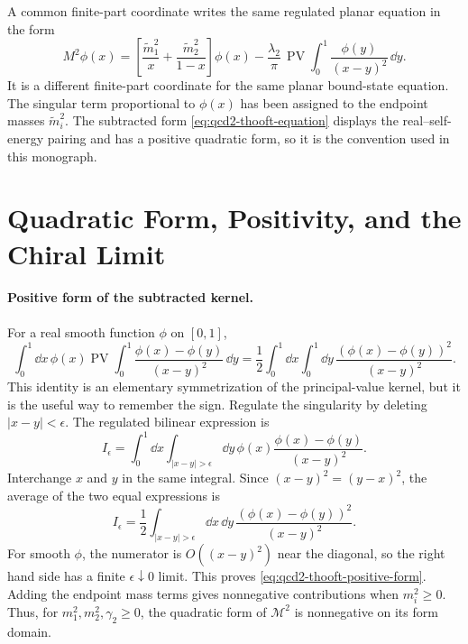 \begin{remark}
A common finite-part coordinate writes the same regulated planar equation
in the form
\[
  M^2\phi(x)
  =
  \left[
    \frac{\widetilde m_1^2}{x}
    +
    \frac{\widetilde m_2^2}{1-x}
  \right]\phi(x)
  -
  \frac{\lambda_2}{\pi}\,
  \operatorname{PV}\int_0^1
  \frac{\phi(y)}{(x-y)^2}\,\dd y .
\]
It is a different finite-part coordinate for the same planar bound-state
equation.  The singular term proportional to \(\phi(x)\) has been assigned
to the endpoint masses \(\widetilde m_i^2\).  The subtracted form
\eqref{eq:qcd2-thooft-equation} displays the real--self-energy pairing and
has a positive quadratic form, so it is the convention used in this
monograph.
\end{remark}

\section{Quadratic Form, Positivity, and the Chiral Limit}

\paragraph{Positive form of the subtracted kernel.}
For a real smooth function \(\phi\) on \([0,1]\),
\begin{equation}
  \int_0^1\dd x\,\phi(x)
  \operatorname{PV}\int_0^1
  \frac{\phi(x)-\phi(y)}{(x-y)^2}\,\dd y
  =
  \frac12
  \int_0^1\dd x\int_0^1\dd y\,
  \frac{(\phi(x)-\phi(y))^2}{(x-y)^2}.
  \label{eq:qcd2-thooft-positive-form}
\end{equation}
This identity is an elementary symmetrization of the principal-value kernel,
but it is the useful way to remember the sign.  Regulate the singularity by
deleting \(|x-y|<\epsilon\).  The regulated bilinear expression is
\[
  I_\epsilon
  =
  \int_0^1\dd x\int_{|x-y|>\epsilon}\dd y\,
  \phi(x)\frac{\phi(x)-\phi(y)}{(x-y)^2}.
\]
Interchange \(x\) and \(y\) in the same integral.  Since
\((x-y)^2=(y-x)^2\), the average of the two equal expressions is
\[
  I_\epsilon
  =
  \frac12
  \int_{|x-y|>\epsilon}\dd x\,\dd y\,
  \frac{(\phi(x)-\phi(y))^2}{(x-y)^2}.
\]
For smooth \(\phi\), the numerator is \(O((x-y)^2)\) near the diagonal, so
the right hand side has a finite \(\epsilon\downarrow0\) limit.  This proves
\eqref{eq:qcd2-thooft-positive-form}.  Adding the endpoint mass terms gives
nonnegative contributions when \(m_i^2\geq0\).
Thus, for \(m_1^2,m_2^2,\gamma_2\geq0\), the quadratic form of
\(\mathcal M^2\) is nonnegative on its form domain.

